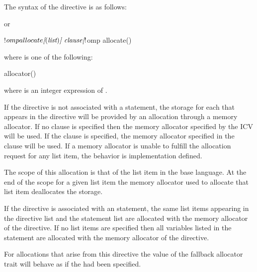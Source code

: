 \begin{fortranspecific}
The syntax of the  directive is as follows:


or
\begin{ompfPragma}
!$omp allocate\plc{[}()\plc{] clause}
\plc{[}!$omp allocate() 
\plc{[...]}
\end{ompfPragma}

where  is one of the following:

\begin{indentedcodelist}
allocator()
\end{indentedcodelist}

where  is an integer expression of  .

\end{fortranspecific}

\descr

If the directive is not associated with a statement, the storage for each 
 that appears in the directive will be provided by an allocation 
through a memory allocator. If no clause is specified then the memory allocator 
specified by the  ICV will be used. If the  
clause is specified, the memory allocator specified in the clause will be used. 
If a memory allocator is unable to fulfill the allocation request for any list 
item, the behavior is implementation defined.

The scope of this allocation is that of the list item in the base language. At 
the end of the scope for a given list item the memory allocator used to allocate 
that list item deallocates the storage.

\begin{fortranspecific}
If the directive is associated with an  statement, the same list 
items appearing in the directive list and the  statement list are 
allocated with the memory allocator of the directive. If no list items are 
specified then all variables listed in the  statement are 
allocated with the memory allocator of the directive.
\end{fortranspecific}

For allocations that arise from this directive the  value of the 
fallback allocator trait will behave as if the  had been specified.


